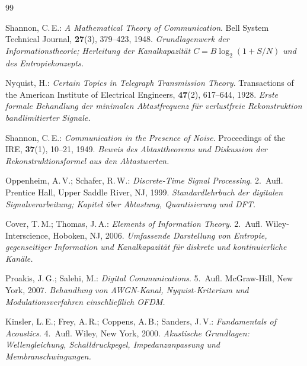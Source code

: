 ﻿\documentclass[12pt,a4paper,titlepage]{report}
\begin{document}
\newpage
\begin{thebibliography}{99}


Shannon, C.\,E.:
\textit{A Mathematical Theory of Communication}.
Bell System Technical Journal, \textbf{27}(3), 379--423, 1948.
\newline\textit{Grundlagenwerk der Informationstheorie; Herleitung der Kanalkapazität
$C = B\log_2(1+S/N)$ und des Entropiekonzepts.}

Nyquist, H.:
\textit{Certain Topics in Telegraph Transmission Theory}.
Transactions of the American Institute of Electrical Engineers, \textbf{47}(2),
617--644, 1928.
\newline\textit{Erste formale Behandlung der minimalen Abtastfrequenz für
verlustfreie Rekonstruktion bandlimitierter Signale.}

Shannon, C.\,E.:
\textit{Communication in the Presence of Noise}.
Proceedings of the IRE, \textbf{37}(1), 10--21, 1949.
\newline\textit{Beweis des Abtasttheorems und Diskussion der
Rekonstruktionsformel aus den Abtastwerten.}

Oppenheim, A.\,V.; Schafer, R.\,W.:
\textit{Discrete-Time Signal Processing}. 2.~Aufl.
Prentice Hall, Upper Saddle River, NJ, 1999.
\newline\textit{Standardlehrbuch der digitalen Signalverarbeitung; Kapitel
über Abtastung, Quantisierung und DFT.}

Cover, T.\,M.; Thomas, J.\,A.:
\textit{Elements of Information Theory}. 2.~Aufl.
Wiley-Interscience, Hoboken, NJ, 2006.
\newline\textit{Umfassende Darstellung von Entropie, gegenseitiger Information
und Kanalkapazität für diskrete und kontinuierliche Kanäle.}

Proakis, J.\,G.; Salehi, M.:
\textit{Digital Communications}. 5.~Aufl.
McGraw-Hill, New York, 2007.
\newline\textit{Behandlung von AWGN-Kanal, Nyquist-Kriterium und
Modulationsverfahren einschließlich OFDM.}

Kinsler, L.\,E.; Frey, A.\,R.; Coppens, A.\,B.; Sanders, J.\,V.:
\textit{Fundamentals of Acoustics}. 4.~Aufl.
Wiley, New York, 2000.
\newline\textit{Akustische Grundlagen: Wellengleichung, Schalldruckpegel,
Impedanzanpassung und Membranschwingungen.}


\end{thebibliography}
\end{document}
